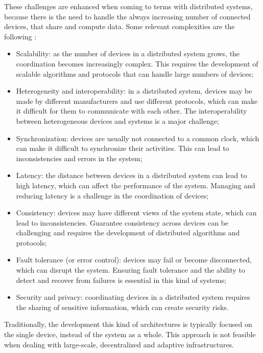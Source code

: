These challenges are enhanced when coming to terms with distributed systems, because there is the need to handle the always increasing number of connected devices, that share and compute data.\newline
Some relevant complexities are the following \cite{distributed_systems_challenges}:
\begin{itemize}
    \item Scalability: as the number of devices in a distributed system grows, the coordination becomes increasingly complex. This requires the development of scalable algorithms and protocols that can handle large numbers of devices;
    \item Heterogeneity and interoperability: in a distributed system, devices may be made by different manufacturers and use different protocols, which can make it difficult for them to communicate with each other. The interoperability between heterogeneous devices and systems is a major challenge;
    \item Synchronization: devices are usually not connected to a common clock, which can make it difficult to synchronize their activities. This can lead to inconsistencies and errors in the system;
    \item Latency: the distance between devices in a distributed system can lead to high latency, which can affect the performance of the system. Managing and reducing latency is a challenge in the coordination of devices;
    \item Consistency: devices may have different views of the system state, which can lead to inconsistencies. Guarantee consistency across devices can be challenging and requires the development of distributed algorithms and protocols;
    \item Fault tolerance (or error control): devices may fail or become disconnected, which can disrupt the system. Ensuring fault tolerance and the ability to detect and recover from failures is essential in this kind of systems;
    \item Security and privacy: coordinating devices in a distributed system requires the sharing of sensitive information, which can create security risks.
\end{itemize}

Traditionally, the development this kind of architectures is typically focused on the single device, instead of the system as a whole. This approach is not feasible when dealing with large-scale, decentralized and adaptive infrastructures.

